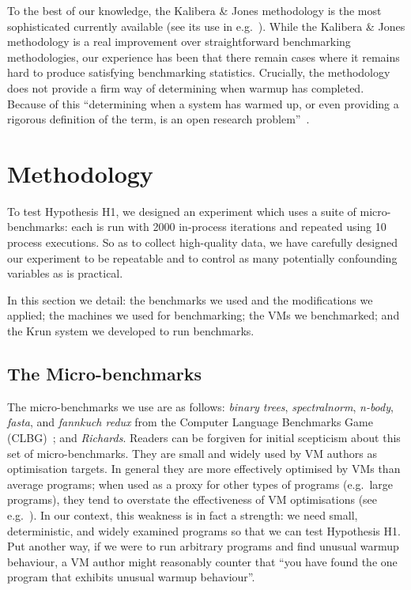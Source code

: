 \documentclass[preprint,numbers,10pt]{sigplanconf}
\newcommand{\kalibera}{Kalibera \& Jones\xspace}
\newcommand{\krun}{Krun\xspace}
\newcommand{\hypone}{H1\xspace}
\newcommand{\binarytrees}{\emph{binary trees}\xspace}
\newcommand{\richards}{\emph{Richards}\xspace}
\newcommand{\spectralnorm}{\emph{spectralnorm}\xspace}
\newcommand{\nbody}{\emph{n-body}\xspace}
\newcommand{\fasta}{\emph{fasta}\xspace}
\newcommand{\fannkuch}{\emph{fannkuch redux}\xspace}
\begin{document}
To the best of our knowledge, the \kalibera methodology is the most
sophisticated currently available (see its use in
e.g.~\cite{barrett15approaches,grimmer15dynamically}). While the \kalibera
methodology is a real improvement over straightforward benchmarking methodologies,
our experience has been that there remain cases where it remains hard to produce
satisfying benchmarking statistics. Crucially, the methodology does not
provide a firm way of determining when warmup has completed. Because of this
``determining when a system has warmed up, or even providing a
rigorous definition of the term, is an open research problem''~\cite{seaton15phd}.


\section{Methodology}
\label{sec:methodology}

To test Hypothesis H1, we designed an experiment which uses a suite of
micro-benchmarks: each is run with 2000 in-process iterations and repeated
using 10 process executions. So as
to collect high-quality data, we have carefully designed our
experiment to be repeatable and to control as many potentially confounding variables as
is practical.

In this section we detail: the benchmarks we used and the modifications we
applied; the machines we used for benchmarking; the VMs we benchmarked; and the
\krun system we developed to run benchmarks.


\subsection{The Micro-benchmarks}

The micro-benchmarks we use are as follows: \binarytrees, \spectralnorm, \nbody,
\fasta, and \fannkuch from the Computer Language Benchmarks Game (CLBG)~\cite{clbg}; and
\richards. Readers can be forgiven for initial scepticism about this set of micro-benchmarks.
They are small and widely
used by VM authors as optimisation targets. In general they are more effectively
optimised by VMs than average programs; when used as a proxy for other types
of programs (e.g.~large programs), they tend to overstate the effectiveness of
VM optimisations (see e.g.~\cite{ratanaworabhan09jsmeter}). In our context, this weakness is in fact a strength: we need
small, deterministic, and widely examined programs so that we can test
Hypothesis \hypone. Put another way, if we were to run arbitrary programs
and find unusual warmup behaviour, a VM author might reasonably counter that
``you have found the one program that exhibits unusual warmup behaviour''.
\end{document}
